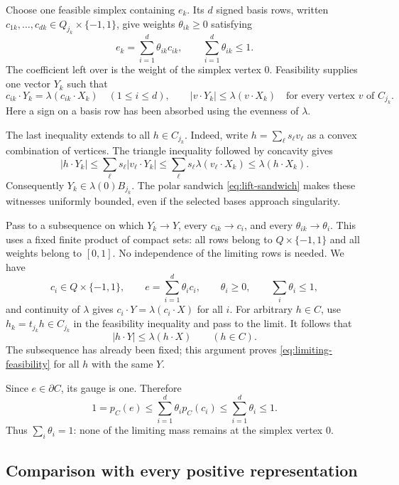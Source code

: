 Choose one feasible simplex containing $e_k$. Its $d$ signed basis
rows, written $c_{1k},\ldots,c_{dk}\in Q_{j_k}\times\{-1,1\}$,
give weights $\theta_{ik}\ge0$ satisfying
\begin{equation}\label{eq:approximate-representation}
 e_k=\sum_{i=1}^d\theta_{ik}c_{ik},
 \qquad \sum_{i=1}^d\theta_{ik}\le1.
\end{equation}
The coefficient left over is the weight of the simplex vertex $0$.
Feasibility supplies one vector $Y_k$ such that
\[
 c_{ik}\cdot Y_k=\lambda(c_{ik}\cdot X_k)\quad(1\le i\le d),
 \qquad
 |v\cdot Y_k|\le\lambda(v\cdot X_k)
 \quad\text{for every vertex $v$ of $C_{j_k}$}.
\]
Here a sign on a basis row has been absorbed using the evenness of
$\lambda$.

The last inequality extends to all $h\in C_{j_k}$. Indeed, write
$h=\sum_\ell s_\ell v_\ell$ as a convex combination of vertices.
The triangle inequality followed by concavity gives
\[
 |h\cdot Y_k|
 \le\sum_\ell s_\ell|v_\ell\cdot Y_k|
 \le\sum_\ell s_\ell\lambda(v_\ell\cdot X_k)
 \le\lambda(h\cdot X_k).
\]
Consequently $Y_k\in\lambda(0)B_{j_k}$. The polar sandwich
\eqref{eq:lift-sandwich} makes these witnesses uniformly bounded,
even if the selected bases approach singularity.

Pass to a subsequence on which $Y_k\to Y$, every $c_{ik}\to c_i$,
and every $\theta_{ik}\to\theta_i$. This uses a fixed finite product
of compact sets: all rows belong to $Q\times\{-1,1\}$ and all
weights belong to $[0,1]$. No independence of the limiting rows is
needed. We have
\[
 c_i\in Q\times\{-1,1\},\qquad
 e=\sum_{i=1}^d\theta_i c_i,\qquad
 \theta_i\ge0,\qquad \sum_i\theta_i\le1,
\]
and continuity of $\lambda$ gives
$c_i\cdot Y=\lambda(c_i\cdot X)$ for all $i$.
For arbitrary $h\in C$, use $h_k=t_{j_k}h\in C_{j_k}$ in the
feasibility inequality and pass to the limit. It follows that
\begin{equation}\label{eq:limiting-feasibility}
 |h\cdot Y|\le\lambda(h\cdot X)\qquad(h\in C).
\end{equation}
The subsequence has already been fixed; this argument proves
\eqref{eq:limiting-feasibility} for all $h$ with the same $Y$.

Since $e\in\partial C$, its gauge is one. Therefore
\[
 1=p_C(e)\le\sum_{i=1}^d\theta_i p_C(c_i)
   \le\sum_{i=1}^d\theta_i\le1.
\]
Thus $\sum_i\theta_i=1$: none of the limiting mass remains at the
simplex vertex $0$.

\subsection{Comparison with every positive representation}

